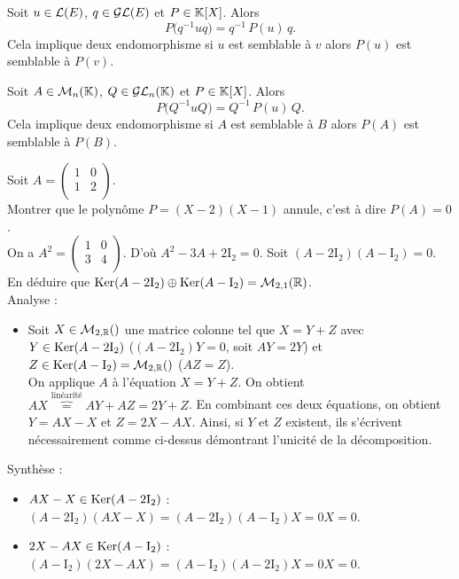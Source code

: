 \documentclass{book}
\begin{document}
\begin{Proposition}[Conjugaison]
Soit $u\in  \mathcal{L}(E)$, $q\in  \mathcal{GL}(E)$ et $P\in  \mathbb{K} [X]$.
Alors
\[ P \bigl( q^{-1}uq \bigr) = q^{-1} \, P(u) \, q. \]
Cela implique deux endomorphisme si $u$ est semblable à $v$ alors $P(u)$ est semblable à $P(v)$.
\end{Proposition}
\begin{Proposition}[Conjugaison]
Soit $A\in  \mathcal{M}_{n}(\mathbb{K})$, $Q\in  \mathcal{GL}_n(\mathbb{K})$ et $P\in  \mathbb{K} [X]$.
Alors
\[ P \bigl( Q^{-1}u Q \bigr) = Q^{-1} \, P(u) \, Q. \]
Cela implique deux endomorphisme si $A$ est semblable à $B$ alors $P(A)$ est semblable à $P(B)$.
\end{Proposition}
\begin{Exemple}
Soit $A=\begin{pmatrix}
1 &0 \\ 1&2\\
\end{pmatrix}$.\\
Montrer que le polynôme $P=(X-2)(X-1)$ annule, c'est à dire $P(A)=0$.\\
On a $A^2=\begin{pmatrix}
1 &0 \\ 3&4\\
\end{pmatrix}$. D'où $A^2-3A+2\mathrm{I}_2=0$. Soit  $(A-2\mathrm{I}_2)(A-\mathrm{I}_2)=0.$
En déduire que $\operatorname{Ker}(A-2\mathrm{I}_2)\oplus \operatorname{Ker}(A-\mathrm{I}_2)=\mathcal{M}_{2,1}(\mathbb{R})$.\\
Analyse :
\begin{itemize}
\item  Soit $X\in \M{2}{\R}$ une matrice colonne tel que $X=Y+Z$ avec  $Y\in \operatorname{Ker}(A-2\mathrm{I}_2)$ ($(A-2\mathrm{I}_2)Y=0$, soit $AY=2Y$) et  $Z\in\Ker(A-\mathrm{I}_2)=\M{2}{\R}$ ($AZ=Z$).\\
On applique $A$ à l'équation $X=Y+Z$. On obtient $AX\overbrace{=}^{\text{linéarité}}AY+AZ=2Y+Z$. En combinant ces deux équations, on obtient $Y=AX-X$ et $Z=2X-AX$. Ainsi, si $Y$ et $Z$ existent, ils s'écrivent nécessairement comme ci-dessus démontrant l'unicité de la décomposition.\\
\end{itemize}
Synthèse :
\begin{itemize}
\item $AX-X\in\operatorname{Ker}(A-2\mathrm{I}_2)$ :  $(A-2\mathrm{I}_2)(AX-X)=(A-2\mathrm{I}_2)(A-\mathrm{I}_2)X=0X=0.$
\item $2X-AX\in\operatorname{Ker}(A-\mathrm{I}_2)$ :  $(A-\mathrm{I}_2)(2X-AX)=(A-\mathrm{I}_2)(A-2\mathrm{I}_2)X=0X=0.$ 
\end{itemize}
\end{Exemple}
\end{document}
